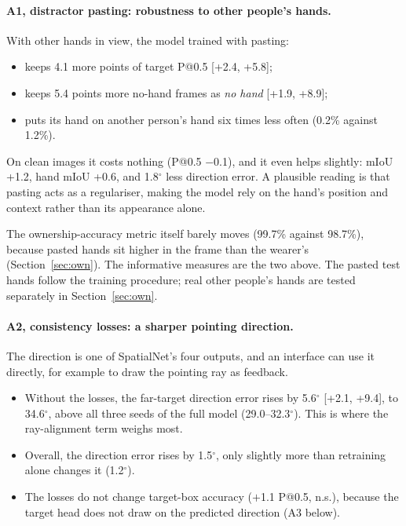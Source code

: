 \paragraph{A1, distractor pasting: robustness to other people's hands.} With other hands in view, the model trained with pasting:
\begin{itemize}
\item keeps 4.1 more points of target P@0.5 [+2.4, +5.8];
\item keeps 5.4 points more no-hand frames as \emph{no hand} [+1.9, +8.9];
\item puts its hand on another person's hand six times less often (0.2\% against 1.2\%).
\end{itemize}
On clean images it costs nothing (P@0.5 $-$0.1), and it even helps slightly: mIoU +1.2, hand mIoU +0.6, and 1.8$^\circ$ less direction error. A plausible reading is that pasting acts as a regulariser, making the model rely on the hand's position and context rather than its appearance alone.

The ownership-accuracy metric itself barely moves (99.7\% against 98.7\%), because pasted hands sit higher in the frame than the wearer's (Section~\ref{sec:own}). The informative measures are the two above. The pasted test hands follow the training procedure; real other people's hands are tested separately in Section~\ref{sec:own}.

\paragraph{A2, consistency losses: a sharper pointing direction.} The direction is one of SpatialNet's four outputs, and an interface can use it directly, for example to draw the pointing ray as feedback.
\begin{itemize}
\item Without the losses, the far-target direction error rises by 5.6$^\circ$ [+2.1, +9.4], to 34.6$^\circ$, above all three seeds of the full model (29.0--32.3$^\circ$). This is where the ray-alignment term weighs most.
\item Overall, the direction error rises by 1.5$^\circ$, only slightly more than retraining alone changes it (1.2$^\circ$).
\item The losses do not change target-box accuracy ($+$1.1 P@0.5, n.s.), because the target head does not draw on the predicted direction (A3 below).
\end{itemize}

